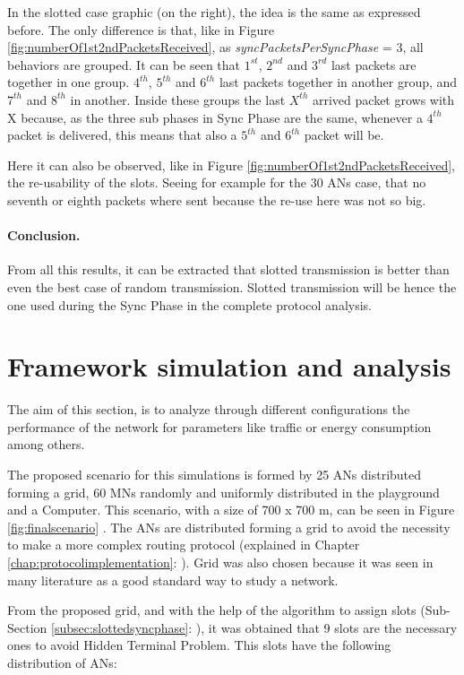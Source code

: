In the slotted case graphic (on the right), the idea is the same as expressed before. The only difference is that, like in Figure 
\ref{fig:numberOf1st2ndPacketsReceived}, as \textit{syncPacketsPerSyncPhase} = 3, all behaviors are grouped. It can be seen that $1^{st}$, $2^{nd}$ and 
$3^{rd}$ last packets are together in one group. $4^{th}$, $5^{th}$ and $6^{th}$ last packets together in another group, and $7^{th}$ and $8^{th}$ in
another. Inside these groups the last $X^{th}$ arrived packet grows with X because, as the three sub phases in Sync Phase are the same, whenever a 
$4^{th}$ packet is delivered, this means that also a $5^{th}$ and $6^{th}$ packet will be.

Here it can also be observed, like in Figure \ref{fig:numberOf1st2ndPacketsReceived}, the re-usability of the slots. Seeing for example for the 
30 \acp{AN} case, that no seventh or eighth packets where sent because the re-use here was not so big.

\paragraph{Conclusion.} From all this results, it can be extracted that slotted transmission is better than even the best case of random transmission. 
Slotted transmission will be hence the one used during the Sync Phase in the complete protocol analysis.

\section{Framework simulation and analysis}

The aim of this section, is to analyze through different configurations the performance of the network for parameters like traffic or energy 
consumption among others.

The proposed scenario for this simulations is formed by 25 \acp{AN} distributed forming a grid, 60 \acp{MN} randomly and uniformly distributed in the
playground and a Computer. This scenario, with a size of 700 x 700 m, can be seen in Figure \ref{fig:finalscenario} . The \acp{AN} 
are distributed forming a grid to avoid the necessity to make a more complex routing protocol (explained in Chapter \ref{chap:protocolimplementation}: 
). Grid was also chosen because it was seen in many literature as a good standard way to study a network.

From the proposed grid, and with the help of the algorithm to assign slots (Sub-Section \ref{subsec:slottedsyncphase}: 
), it was obtained that 9 slots are the necessary ones to avoid Hidden Terminal Problem. This slots have the 
following distribution of \acp{AN}:

